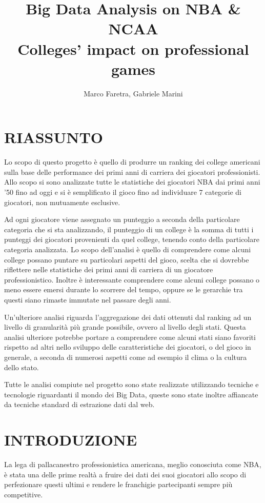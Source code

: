 \documentclass[10.5pt,a4paper,twocolumn]{article}
\author{Marco Faretra, Gabriele Marini}
\title{\textbf{Big Data Analysis on NBA \& NCAA}\\Colleges' impact on professional games}
\begin{document}
	
\maketitle
\thispagestyle{empty}
\pagestyle{empty}
		
\section*{RIASSUNTO}

Lo scopo di questo progetto è quello di produrre un ranking dei college americani sulla base delle performance dei primi anni di carriera dei giocatori professionisti. Allo scopo si sono analizzate tutte le statistiche dei giocatori NBA dai primi anni '50 fino ad oggi e si è semplificato il gioco fino ad individuare 7 categorie di giocatori, non mutuamente esclusive.

Ad ogni giocatore viene assegnato un punteggio a seconda della particolare categoria che si sta analizzando, il punteggio di un college è la somma di tutti i punteggi dei giocatori provenienti da quel college, tenendo conto della particolare categoria analizzata. Lo scopo dell'analisi è quello di comprendere come alcuni college possano puntare su particolari aspetti del gioco, scelta che si dovrebbe riflettere nelle statistiche dei primi anni di carriera di un giocatore professionistico. Inoltre è interessante comprendere come alcuni college possano o meno essere emersi durante lo scorrere del tempo, oppure se le gerarchie tra questi siano rimaste immutate nel passare degli anni. 

Un'ulteriore analisi riguarda l'aggregazione dei dati ottenuti dal ranking ad un livello di granularità più grande possibile, ovvero al livello degli stati. Questa analisi ulteriore potrebbe portare a comprendere come alcuni stati siano favoriti rispetto ad altri nello sviluppo delle caratteristiche dei giocatori, o del gioco in generale, a seconda di numerosi aspetti come ad esempio il clima o la cultura dello stato.

Tutte le analisi compiute nel progetto sono state realizzate utilizzando tecniche e tecnologie riguardanti il mondo dei Big Data, queste sono state inoltre affiancate da tecniche standard di estrazione dati dal web.

\section{INTRODUZIONE} 

La lega di pallacanestro professionistica americana, meglio conosciuta come NBA, è stata una delle prime realtà a fruire dei dati dei suoi giocatori allo scopo di perfezionare questi ultimi e rendere le franchigie partecipanti sempre più competitive. 
\end{document}
